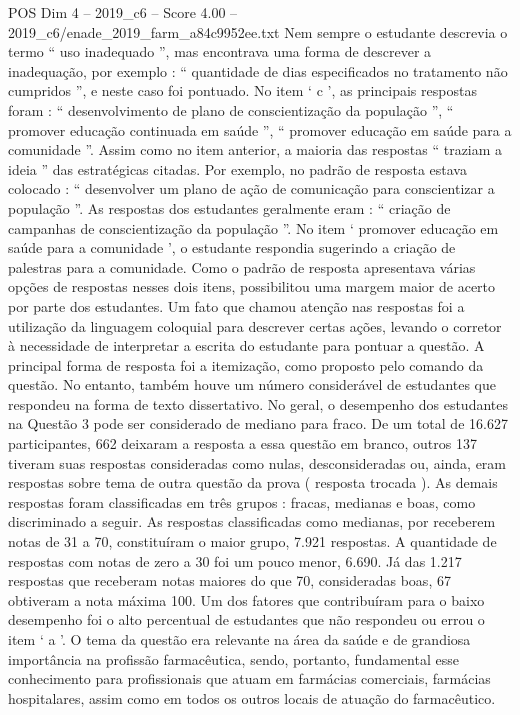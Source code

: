 \begin{textsample}{POS Dim 4 – 2019\_c6 – Score 4.00 – 2019\_c6/enade\_2019\_farm\_a84c9952ee.txt}
Nem sempre o estudante descrevia o termo “ uso inadequado ”, mas encontrava uma forma de descrever a inadequação, por exemplo : “ quantidade de dias especificados no tratamento não cumpridos ”, e neste caso foi pontuado.
No item ‘ c ’, as principais respostas foram : “ desenvolvimento de plano de conscientização da população ”, “ promover educação continuada em saúde ”, “ promover educação em saúde para a comunidade ”.
Assim como no item anterior, a maioria das respostas “ traziam a ideia ” das estratégicas citadas.
Por exemplo, no padrão de resposta estava colocado : “ desenvolver um plano de ação de comunicação para conscientizar a população ”.
As respostas dos estudantes geralmente eram : “ criação de campanhas de conscientização da população ”.
No item ‘ promover educação em saúde para a comunidade ’, o estudante respondia sugerindo a criação de palestras para a comunidade.
Como o padrão de resposta apresentava várias opções de respostas nesses dois itens, possibilitou uma margem maior de acerto por parte dos estudantes.
Um fato que chamou atenção nas respostas foi a utilização da linguagem coloquial para descrever certas ações, levando o corretor à necessidade de interpretar a escrita do estudante para pontuar a questão.
A principal forma de resposta foi a itemização, como proposto pelo comando da questão.
No entanto, também houve um número considerável de estudantes que respondeu na forma de texto dissertativo.
No geral, o desempenho dos estudantes na Questão 3 pode ser considerado de mediano para fraco.
De um total de 16.627 participantes, 662 deixaram a resposta a essa questão em branco, outros 137 tiveram suas respostas consideradas como nulas, desconsideradas ou, ainda, eram respostas sobre tema de outra questão da prova ( resposta trocada ).
As demais respostas foram classificadas em três grupos : fracas, medianas e boas, como discriminado a seguir.
As respostas classificadas como medianas, por receberem notas de 31 a 70, constituíram o maior grupo, 7.921 respostas.
A quantidade de respostas com notas de zero a 30 foi um pouco menor, 6.690.
Já das 1.217 respostas que receberam notas maiores do que 70, consideradas boas, 67 obtiveram a nota máxima 100.
Um dos fatores que contribuíram para o baixo desempenho foi o alto percentual de estudantes que não respondeu ou errou o item ‘ a ’.
O tema da questão era relevante na área da saúde e de grandiosa importância na profissão farmacêutica, sendo, portanto, fundamental esse conhecimento para profissionais que atuam em farmácias comerciais, farmácias hospitalares, assim como em todos os outros locais de atuação do farmacêutico.

\end{textsample}
